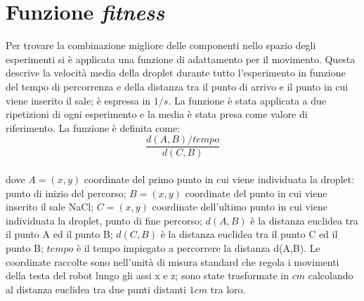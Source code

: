 \section{Funzione \emph{fitness}}
Per trovare la combinazione migliore delle componenti nello spazio degli esperimenti si è applicata una funzione di adattamento per il movimento. Questa descrive la velocità media della droplet durante tutto l'esperimento in funzione del tempo di percorrenza e della distanza tra il punto di arrivo e il punto in cui viene inserito il sale; è espressa in $1/s$. La funzione è stata applicata a due ripetizioni di ogni esperimento e la media è stata presa come valore di riferimento. La funzione è definita come:
\begin{equation*} 	
	\frac { d(A,B)/tempo }{ d(C,B) } 
\end{equation*}
\\dove
$A=(x,y)$ coordinate del primo punto in cui viene individuata la droplet: punto di inizio del percorso;
$B=(x,y)$ coordinate del punto in cui viene inserito il sale NaCl;
$C=(x,y)$ coordinate dell'ultimo punto in cui viene individuata la droplet, punto di fine percorso;
$d(A,B)$ è la distanza euclidea tra il punto A ed il punto B; $d(C,B)$ è la distanza euclidea tra il punto C ed il punto B; $tempo$ è il tempo impiegato a percorrere la distanza d(A,B).
Le coordinate raccolte sono nell'unità di misura standard che regola i movimenti della testa del robot lungo gli assi x e z; sono state trasformate in $cm$ calcolando al distanza euclidea tra due punti distanti $1cm$ tra loro.
